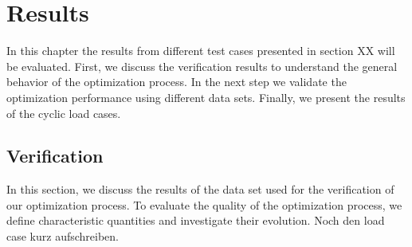     
    
    \chapter{Results}\label{chap: results}

    In this chapter the results from different test cases presented in section XX will be evaluated. First, we discuss the verification results to understand the general behavior of the optimization process. In the next step we validate the optimization performance using different data sets. 
    Finally, we present the results of the cyclic load cases.

    
    \section{Verification}\label{sec: verification}

    In this section, we discuss the results of the data set used for the verification of our optimization process. To evaluate the quality of the optimization process, we define characteristic quantities and investigate their evolution. 
    Noch den load case kurz aufschreiben.



